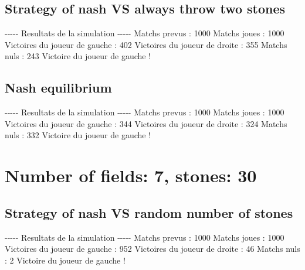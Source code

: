 \documentclass{article}%
\begin{document}
%
\subsection{Strategy of nash VS always throw two stones}%
\label{subsec:Strategy of nash VS always throw two stones}%
{-}{-}{-}{-}{-} Resultats de la simulation {-}{-}{-}{-}{-}\newline%
		\newline%
Matchs prevus : 1000\newline%
Matchs joues : 1000\newline%
\newline%
Victoires du joueur de gauche : 402\newline%
Victoires du joueur de droite : 355\newline%
Matchs nuls : 243\newline%
\newline%
Victoire du joueur de gauche !

%
\subsection{Nash equilibrium}%
\label{subsec:Nash equilibrium}%
{-}{-}{-}{-}{-} Resultats de la simulation {-}{-}{-}{-}{-}\newline%
		\newline%
Matchs prevus : 1000\newline%
Matchs joues : 1000\newline%
\newline%
Victoires du joueur de gauche : 344\newline%
Victoires du joueur de droite : 324\newline%
Matchs nuls : 332\newline%
\newline%
Victoire du joueur de gauche !

%
\section{Number of fields: 7, stones: 30}%
\label{sec:Number of fields 7, stones 30}%
\subsection{Strategy of nash VS random number of stones}%
\label{subsec:Strategy of nash VS random number of stones}%
{-}{-}{-}{-}{-} Resultats de la simulation {-}{-}{-}{-}{-}\newline%
		\newline%
Matchs prevus : 1000\newline%
Matchs joues : 1000\newline%
\newline%
Victoires du joueur de gauche : 952\newline%
Victoires du joueur de droite : 46\newline%
Matchs nuls : 2\newline%
\newline%
Victoire du joueur de gauche !
\end{document}
